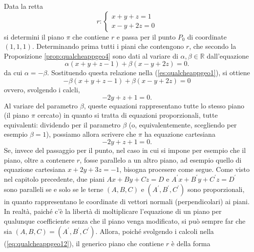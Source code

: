 \begin{es}
  \label{es:qualcheappgeo1}
  Data la retta
  \begin{equation*}
    r:
    \begin{cases}
      x+y+z=1\\
      x-y+2z=0
    \end{cases}
  \end{equation*}
  si determini il piano $\pi$ che contiene $r$ e passa per il punto $P_0$ di coordinate $(1,1,1)$.
  Determinando prima tutti i piani che contengono $r$, che secondo la Proposizione
  \ref{prop:qualcheappgeo4} sono dati al variare di $\alpha,\beta\in \mathds{R}$ dall'equazione
  \begin{equation}
    \label{eq:qualcheappgeo12}
    \alpha(x+y+z-1) +\beta(x-y+2z)=0.
  \end{equation}
  da cui $\alpha=-\beta$. Sostituendo questa relazione nella (\ref{es:qualcheappgeo1}), si ottiene
  \begin{equation*}
    -\beta(x+y+z-1)+\beta(x-y+2z)=0
  \end{equation*}
  ovvero, svolgendo i calcli,
  \begin{equation*}
    -2y+z+1=0.
  \end{equation*}
  Al variare del parametro $\beta$, queste equazioni rappresentano tutte lo stesso piano (il piano
  $\pi$ cercato) in quanto si tratta di equazioni proporzionali, tutte equivalenti: dividendo per
  il parametro $\beta$ (o, equivalentemente, scegliendo per esempio $\beta=1$), possiamo allora scrivere
  che $\pi$ ha equazione cartesiana
  \begin{equation*}
    -2y+z+1=0.
  \end{equation*}
  Se, invece del passaggio per il punto, nel caso in cui si impone per esempio che il piano, oltre a
  contenere $r$, fosse parallelo a un altro piano, ad esempio quello di equazione cartesiana
  $x+2y+3z=-1$, bisogna procesere come segue. Come visto nel capitolo precedente, due piani
  $Ax+By+Cz=D$ e $A^\prime x+B^\prime y+C^\prime z=D^\prime$ sono paralleli se e solo se le terne $(A,B,C)$
  e $(A^\prime,B^\prime,C^{\prime})$ sono proporzionali, in quanto rappresentano le coordinate di vettori
  normali (perpendicolari) ai piani. In realtà, paiché c'è la libertà di moltiplicare l'equazione di un
  piano per qualunque coefficiente senza che il piano venga modificato, si può sempre far che sia
  $(A,B,C)=(A^\prime,B^\prime,C^\prime)$. Allora, poiché svolgendo i calcoli nella
  (\ref{eq:qualcheappgeo12}), il generico piano che contiene $r$ è della forma

\end{es}
